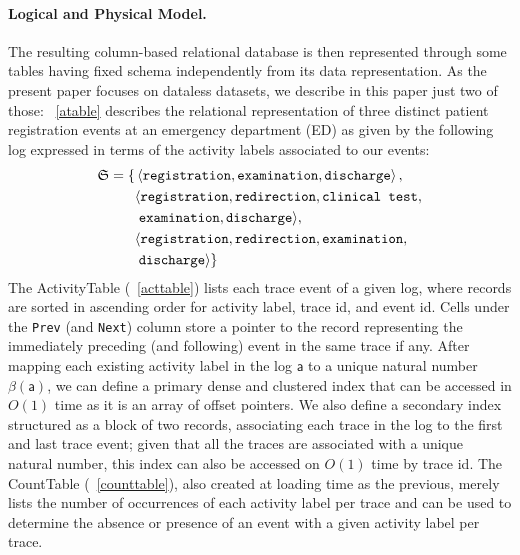 \documentclass[sigconf]{acmart}
\newcommand{\const}[1]{\ensuremath{\mathsf{#1}}}
\begin{document}
\paragraph{Logical and Physical Model.} The resulting column-based relational database is then represented through some tables having fixed schema independently from its data representation. As the present paper focuses on dataless datasets, we describe in this paper just two of those: \tablename~\ref{atable} describes the relational representation of three distinct patient registration events at an emergency department (ED) \cite{Petsis2022} as given by the following log expressed in terms of the activity labels associated to our events:
\begin{equation}\label{ourLog}
\begin{split}
\mathfrak{S}=\{&\braket{\texttt{registration},\texttt{examination},\texttt{discharge}},\\
      &\langle\texttt{registration},\texttt{redirection},\texttt{clinical test},\\
      &\;\texttt{examination}, \texttt{discharge}  \rangle,\\
      &\langle\texttt{registration},\texttt{redirection},\texttt{examination},\\
      &\; \texttt{discharge}  \rangle\}\\
\end{split}
\end{equation}
The ActivityTable (\tablename~\ref{acttable}) lists each trace event of a given log, where records are sorted in ascending order for activity label, trace id, and event id. Cells under the  \texttt{Prev} (and \texttt{Next}) column store a pointer to the record representing the immediately preceding (and following) event in the same trace if any. After mapping each existing activity label in the log $\const{a}$ to a unique natural number $\beta(\const{a})$, we can define a primary dense and clustered index  that can be accessed in $O(1)$ time as it is an array of offset pointers. We also define a secondary index structured as a block of two records, associating each trace in the log to the  first and last trace event; given that all the traces are associated with a unique natural number, this index can also be accessed on $O(1)$ time by trace id. The CountTable (\tablename~\ref{counttable}), also created at loading time as the previous, merely lists the number of occurrences of each activity label per trace and can be used to determine the absence or presence of an event with a given activity label per trace.
\end{document}
